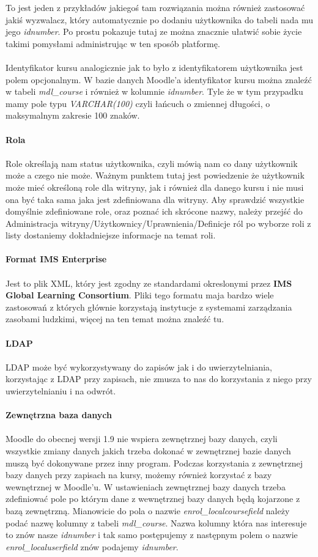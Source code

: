 To jest jeden z przykładów jakiegoś tam rozwiązania można również zastosować jakiś wyzwalacz, który automatycznie po dodaniu użytkownika do tabeli nada mu jego \textit{idnumber}. Po prostu pokazuje tutaj ze można znacznie ułatwić sobie życie takimi pomysłami administrując w ten sposób platformę. \\
\ \\
Identyfikator kursu analogicznie jak to było z identyfikatorem użytkownika jest polem opcjonalnym. W bazie danych Moodle'a identyfikator kursu można znaleźć w tabeli \textit{mdl\_course} i również w kolumnie \textit{idnumber}. Tyle że w tym przypadku mamy pole typu \textit{VARCHAR(100)} czyli łańcuch o zmiennej długości, o maksymalnym zakresie 100 znaków. \\
\ \\
\textbf{Rola} \\
\ \\
Role określają nam status użytkownika, czyli mówią nam co dany użytkownik może a czego nie może. Ważnym punktem tutaj jest powiedzenie że użytkownik może mieć określoną role dla witryny, jak i również dla danego kursu i nie musi ona być taka sama jaka jest zdefiniowana dla witryny. Aby sprawdzić wszystkie domyślnie zdefiniowane role, oraz poznać ich skrócone nazwy, należy przejść do Administracja witryny/Użytkownicy/Uprawnienia/Definicje ról po wyborze roli z listy dostaniemy dokładniejsze informacje na temat roli.\\
\ \\
\textbf{Format IMS Enterprise} \\
\ \\
Jest to plik XML, który jest zgodny ze standardami okreslonymi przez \textbf{IMS Global Learning Consortium}. Pliki tego formatu maja bardzo wiele zastosowań z których głównie korzystają instytucje z systemami zarządzania zasobami ludzkimi, więcej na ten temat można znaleźć tu.\\
\ \\
\textbf{LDAP}\\
\ \\
LDAP może być wykorzystywany do zapisów jak i do uwierzytelniania, korzystając z LDAP przy zapisach, nie zmusza to nas do korzystania z niego przy uwierzytelnianiu i na odwrót.\\
\ \\
\textbf{Zewnętrzna baza danych} \\
\ \\
Moodle do obecnej wersji 1.9 nie wspiera zewnętrznej bazy danych, czyli wszystkie zmiany danych jakich trzeba dokonać w zewnętrznej bazie danych muszą być dokonywane przez inny program. Podczas korzystania z zewnętrznej bazy danych przy zapisach na kursy, możemy również korzystać z bazy wewnętrznej w Moodle'u. W ustawieniach zewnętrznej bazy danych trzeba zdefiniować pole po którym dane z wewnętrznej bazy danych będą kojarzone z bazą zewnętrzną. Mianowicie do pola o nazwie \textit{enrol\_localcoursefield} należy podać nazwę kolumny z tabeli \textit{mdl\_course}. Nazwa kolumny która nas interesuje to znów nasze \textit{idnumber} i tak samo postępujemy z następnym polem o nazwie \textit{enrol\_localuserfield} znów podajemy \textit{idnumber}.\\
